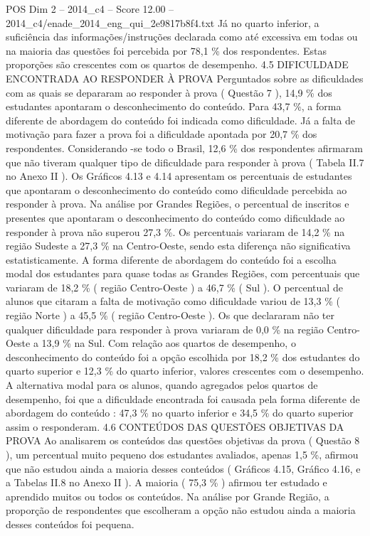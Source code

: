 \begin{textsample}{POS Dim 2 – 2014\_c4 – Score 12.00 – 2014\_c4/enade\_2014\_eng\_qui\_2e9817b8f4.txt}
Já no quarto inferior, a suficiência das informações/instruções declarada como até excessiva em todas ou na maioria das questões foi percebida por 78,1 \% dos respondentes.
Estas proporções são crescentes com os quartos de desempenho. 4.5 DIFICULDADE ENCONTRADA AO RESPONDER À PROVA Perguntados sobre as dificuldades com as quais se depararam ao responder à prova ( Questão 7 ), 14,9 \% dos estudantes apontaram o desconhecimento do conteúdo.
Para 43,7 \%, a forma diferente de abordagem do conteúdo foi indicada como dificuldade.
Já a falta de motivação para fazer a prova foi a dificuldade apontada por 20,7 \% dos respondentes.
Considerando -se todo o Brasil, 12,6 \% dos respondentes afirmaram que não tiveram qualquer tipo de dificuldade para responder à prova ( Tabela II.7 no Anexo II ).
Os Gráficos 4.13 e 4.14 apresentam os percentuais de estudantes que apontaram o desconhecimento do conteúdo como dificuldade percebida ao responder à prova.
Na análise por Grandes Regiões, o percentual de inscritos e presentes que apontaram o desconhecimento do conteúdo como dificuldade ao responder à prova não superou 27,3 \%.
Os percentuais variaram de 14,2 \% na região Sudeste a 27,3 \% na Centro-Oeste, sendo esta diferença não significativa estatisticamente.
A forma diferente de abordagem do conteúdo foi a escolha modal dos estudantes para quase todas as Grandes Regiões, com percentuais que variaram de 18,2 \% ( região Centro-Oeste ) a 46,7 \% ( Sul ).
O percentual de alunos que citaram a falta de motivação como dificuldade variou de 13,3 \% ( região Norte ) a 45,5 \% ( região Centro-Oeste ).
Os que declararam não ter qualquer dificuldade para responder à prova variaram de 0,0 \% na região Centro-Oeste a 13,9 \% na Sul.
Com relação aos quartos de desempenho, o desconhecimento do conteúdo foi a opção escolhida por 18,2 \% dos estudantes do quarto superior e 12,3 \% do quarto inferior, valores crescentes com o desempenho.
A alternativa modal para os alunos, quando agregados pelos quartos de desempenho, foi que a dificuldade encontrada foi causada pela forma diferente de abordagem do conteúdo : 47,3 \% no quarto inferior e 34,5 \% do quarto superior assim o responderam. 4.6 CONTEÚDOS DAS QUESTÕES OBJETIVAS DA PROVA Ao analisarem os conteúdos das questões objetivas da prova ( Questão 8 ), um percentual muito pequeno dos estudantes avaliados, apenas 1,5 \%, afirmou que não estudou ainda a maioria desses conteúdos ( Gráficos 4.15, Gráfico 4.16, e a Tabelas II.8 no Anexo II ).
A maioria ( 75,3 \% ) afirmou ter estudado e aprendido muitos ou todos os conteúdos.
Na análise por Grande Região, a proporção de respondentes que escolheram a opção não estudou ainda a maioria desses conteúdos foi pequena.

\end{textsample}
